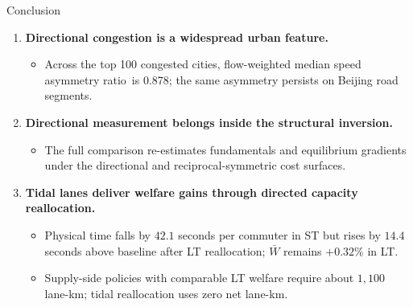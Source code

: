 \documentclass[11pt,aspectratio=169]{beamer}
\newcommand{\good}[1]{\textcolor{blue!70!black}{#1}}
\newcommand{\bad}[1]{\textcolor{red!70!black}{#1}}
\newcommand{\SAR}{speed asymmetry ratio}
\begin{document}
\begin{frame}{Conclusion}
\begin{enumerate}
  \item \textbf{Directional congestion is a widespread urban feature.}
  \begin{itemize}\footnotesize
    \item Across the top 100 congested cities, flow-weighted median \SAR\ is \good{0.878}; the same asymmetry persists on Beijing road segments.
  \end{itemize}
  \item \textbf{Directional measurement belongs inside the structural inversion.}
  \begin{itemize}\footnotesize
    \item The full comparison re-estimates fundamentals and equilibrium gradients under the directional and reciprocal-symmetric cost surfaces.
  \end{itemize}
  \item \textbf{Tidal lanes deliver welfare gains through directed capacity reallocation.}
  \begin{itemize}\footnotesize
    \item Physical time falls by \good{$42.1$ seconds per commuter} in ST but rises by \bad{$14.4$ seconds} above baseline after LT reallocation; $\bar W$ remains \good{$+0.32\%$} in LT.
    \item Supply-side policies with comparable LT welfare require about \bad{$1{,}100$ lane-km}; tidal reallocation uses \good{zero net lane-km}.
  \end{itemize}
\end{enumerate}
\end{frame}

\appendix
\end{document}
